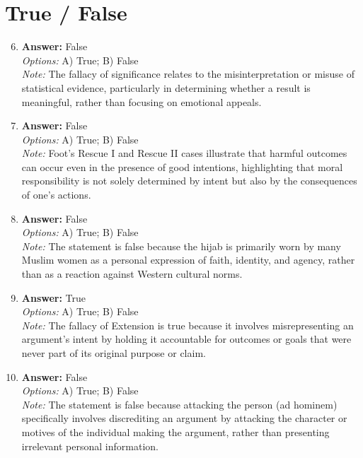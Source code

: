 \documentclass[12pt]{article}
\begin{document}
\section*{True / False}
\begin{enumerate}[label=\arabic*.]
\setcounter{enumi}{5}
\item \textbf{Answer:} False
\\ \textit{Options:} A) True; B) False
\\ \textit{Note:} The fallacy of significance relates to the misinterpretation or misuse of statistical evidence, particularly in determining whether a result is meaningful, rather than focusing on emotional appeals.
\item \textbf{Answer:} False
\\ \textit{Options:} A) True; B) False
\\ \textit{Note:} Foot's Rescue I and Rescue II cases illustrate that harmful outcomes can occur even in the presence of good intentions, highlighting that moral responsibility is not solely determined by intent but also by the consequences of one's actions.
\item \textbf{Answer:} False
\\ \textit{Options:} A) True; B) False
\\ \textit{Note:} The statement is false because the hijab is primarily worn by many Muslim women as a personal expression of faith, identity, and agency, rather than as a reaction against Western cultural norms.
\item \textbf{Answer:} True
\\ \textit{Options:} A) True; B) False
\\ \textit{Note:} The fallacy of Extension is true because it involves misrepresenting an argument's intent by holding it accountable for outcomes or goals that were never part of its original purpose or claim.
\item \textbf{Answer:} False
\\ \textit{Options:} A) True; B) False
\\ \textit{Note:} The statement is false because attacking the person (ad hominem) specifically involves discrediting an argument by attacking the character or motives of the individual making the argument, rather than presenting irrelevant personal information.
\end{enumerate}
\end{document}
